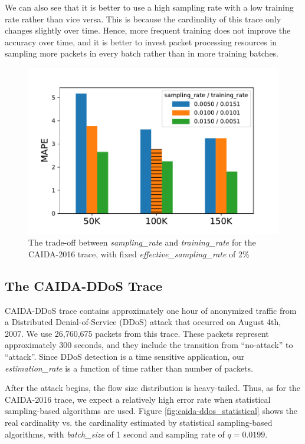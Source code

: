 		We can also see that it is better to use a high sampling rate with a low training rate rather than vice versa. This is because the cardinality of this trace only changes slightly over time. Hence, more frequent training does not improve the accuracy over time, and it is better to invest packet processing resources in sampling more packets in every batch rather than in more training batches.
		
		\begin{figure}[!t]
			\centering
			\includegraphics[width=.49\textwidth]{img/caida-2016_tradeoff.pdf}
			\caption{The trade-off between \emph{sampling\_rate} and \emph{training\_rate} for the CAIDA-2016 trace, with fixed \emph{effective\_sampling\_rate} of 2\%} 
			\label{fig:caida-2016_sampling_training}
		\end{figure}

	\subsection{The CAIDA-DDoS Trace}

		CAIDA-DDoS trace \cite{caidaddos2007} contains approximately one hour of anonymized traffic from a Distributed Denial-of-Service (DDoS) attack that occurred on August 4th, 2007. We use 26,760,675 packets from this trace. These packets represent approximately 300 seconds, and they include the transition from ``no-attack'' to ``attack''. Since DDoS detection is a time sensitive application, our \emph{estimation\_rate} is a function of time rather than number of packets.
		
		After the attack begins, the flow size distribution is heavy-tailed. Thus, as for the CAIDA-2016 trace, we expect a relatively high error rate when statistical sampling-based algorithms are used. Figure \ref{fig:caida-ddos_statistical} shows the real cardinality vs. the cardinality estimated by statistical sampling-based algorithms, with \emph{batch\_size} of 1 second and sampling rate of $q=0.0199$.
		

